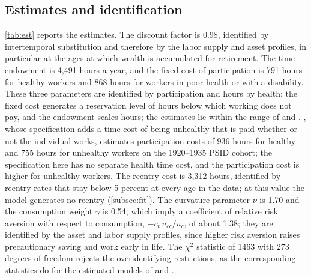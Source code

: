 \subsection{Estimates and identification}\label{subsec:estimates}

\autoref{tab:est} reports the estimates. The discount factor is 0.98, identified by intertemporal substitution and therefore by the labor supply and asset profiles, in particular at the ages at which wealth is accumulated for retirement. %
The time endowment is 4,491 hours a year, and the fixed cost of participation is 791 hours for healthy workers and 868 hours for workers in poor health or with a disability. %
These three parameters are identified by participation and hours by health: the fixed cost generates a reservation level of hours below which working does not pay, and the endowment scales hours; the estimates lie within the range of \citet{french2011effects} and \citet{Borella2023}. %
\citet{Yu2024}, whose specification adds a time cost of being unhealthy that is paid whether or not the individual works, estimates participation costs of 936 hours for healthy and 755 hours for unhealthy workers on the 1920--1935 PSID cohort; the specification here has no separate health time cost, and the participation cost is higher for unhealthy workers. %
The reentry cost is 3,312 hours, identified by reentry rates that stay below 5 percent at every age in the data; at this value the model generates no reentry (\autoref{subsec:fit}). %
The curvature parameter $\nu$ is 1.70 and the consumption weight $\gamma$ is 0.54, which imply a coefficient of relative risk aversion with respect to consumption, $-c_t\,u_{cc}/u_c$, of about 1.38; they are identified by the asset and labor supply profiles, since higher risk aversion raises precautionary saving and work early in life. %
The $\chi^2$ statistic of 1463 with 273 degrees of freedom rejects the overidentifying restrictions, as the corresponding statistics do for the estimated models of \citet{french2005effects} and \citet{french2011effects}. %

